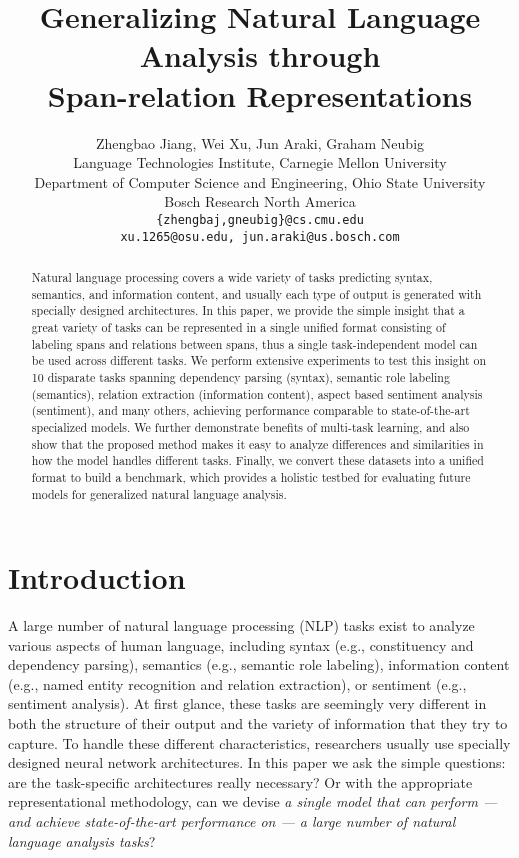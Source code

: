 \documentclass[11pt,a4paper]{article}
\title{Generalizing Natural Language Analysis through \\ Span-relation Representations}
\author{
Zhengbao Jiang, Wei Xu, Jun Araki, Graham Neubig \\
Language Technologies Institute, Carnegie Mellon University \\
Department of Computer Science and Engineering, Ohio State University \\
Bosch Research North America \\
\texttt{\{zhengbaj,gneubig\}@cs.cmu.edu} \\
\texttt{xu.1265@osu.edu, jun.araki@us.bosch.com}
}
\date{}
\begin{document}
\maketitle
\begin{abstract}
Natural language processing covers a wide variety of tasks predicting syntax, semantics, and information content, and usually each type of output is generated with specially designed architectures.
In this paper, we provide the simple insight that a great variety of tasks can be represented in a single unified format consisting of labeling spans and relations between spans, thus a single task-independent model can be used across different tasks.
We perform extensive experiments to test this insight on 10 disparate tasks spanning dependency parsing (syntax), semantic role labeling (semantics), relation extraction (information content), aspect based sentiment analysis (sentiment), and many others, achieving performance comparable to state-of-the-art specialized models.
We further demonstrate benefits of multi-task learning, and also show that the proposed method makes it easy to analyze differences and similarities in how the model handles different tasks.
Finally, we convert these datasets into a unified format to build a benchmark, which provides a holistic testbed for evaluating future models for generalized natural language analysis.
\end{abstract}

\section{Introduction}
A large number of natural language processing (NLP) tasks exist to analyze various aspects of human language, including syntax (e.g., constituency and dependency parsing), semantics (e.g., semantic role labeling), information content (e.g., named entity recognition and relation extraction), or sentiment (e.g., sentiment analysis).
At first glance, these tasks are seemingly very different in both the structure of their output and the variety of information that they try to capture.
To handle these different characteristics, researchers usually use specially designed neural network architectures.
In this paper we ask the simple questions:
are the task-specific architectures really necessary?
Or with the appropriate representational methodology, can we devise \emph{a single model that can perform --- and achieve state-of-the-art performance on --- a large number of natural language analysis tasks}?
\end{document}

